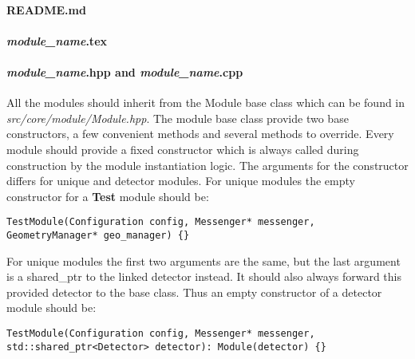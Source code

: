 \paragraph{README.md}
\todo

\paragraph{\textit{module\_name}.tex}
\todo

\paragraph{\textit{module\_name}.hpp and \textit{module\_name}.cpp}
All the modules should inherit from the Module base class which can be found in \textit{src/core/module/Module.hpp}. The module base class provide two base constructors, a few convenient methods and several methods to override. Every module should provide a fixed constructor which is always called during construction by the module instantiation logic. The arguments for the constructor differs for unique and detector modules. For unique modules the empty constructor for a \textbf{Test} module should be:
\begin{verbatim}
TestModule(Configuration config, Messenger* messenger, GeometryManager* geo_manager) {}
\end{verbatim}

For unique modules the first two arguments are the same, but the last argument is a shared\_ptr to the linked detector instead. It should also always forward this provided detector to the base class. Thus an empty constructor of a detector module should be:
\begin{verbatim}
TestModule(Configuration config, Messenger* messenger, std::shared_ptr<Detector> detector): Module(detector) {}
\end{verbatim}

